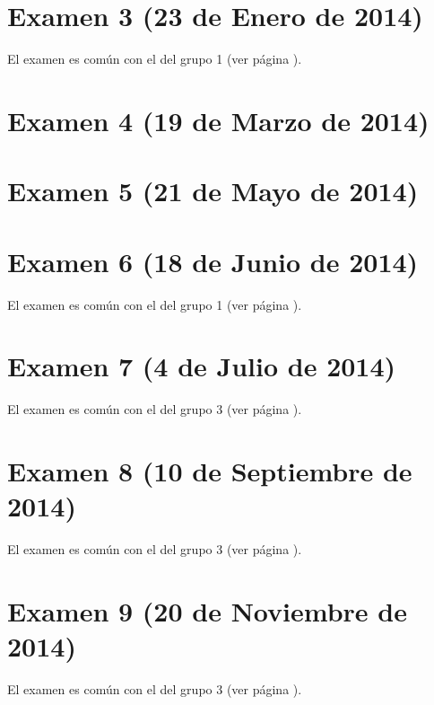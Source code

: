 \documentclass[a4paper,12pt,twoside]{book}
\begin{document}
\section{Examen 3 (23 de Enero de 2014)}
El examen es común con el del grupo 1 (ver página \pageref{examen_13_14_3_3}).
\section{Examen 4 (19 de Marzo de 2014)}
\section{Examen 5 (21 de Mayo de 2014)}
\section{Examen 6 (18 de Junio de 2014)}
El examen es común con el del grupo 1 (ver página \pageref{examen_13_14_3_6}).
\section{Examen 7 (4 de Julio de 2014)}
El examen es común con el del grupo 3 (ver página \pageref{examen_13_14_1_7}). 
\section{Examen 8 (10 de Septiembre de 2014)}
El examen es común con el del grupo 3 (ver página \pageref{examen_13_14_1_8}). 
\section{Examen 9 (20 de Noviembre de 2014)}
El examen es común con el del grupo 3 (ver página \pageref{examen_13_14_1_9}). 

\appendix %






\nocite{Alonso-12b}
\nocite{Bird-99a}
\nocite{Cunningham-10a}
\nocite{Daume-06}
\nocite{Davie-92a}
\nocite{Doets-04a}
\nocite{Fokker-96}
\nocite{Hudak-00a}
\nocite{Hudak-12a}
\nocite{Hutton-07a}
\nocite{OSullivan-08a}
\nocite{Rabhi-99a}
\nocite{Polya-65a}
\nocite{Ruiz-04}
\nocite{Thompson-11a}



\end{document}
